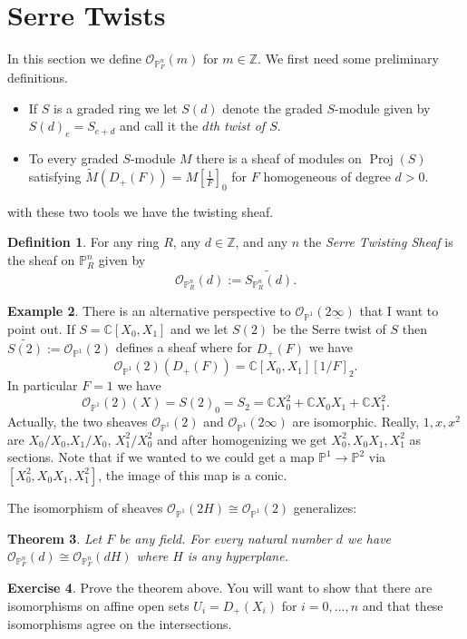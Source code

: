 \documentclass[12pt]{article}
\numberwithin{equation}{section}
\newtheorem{theorem}{Theorem}[subsection]
\theoremstyle{definition}
\newtheorem{definition}[theorem]{Definition}
\newtheorem{example}[theorem]{Example}
\newtheorem{exercise}[theorem]{Exercise}
\theoremstyle{remark}
\newcommand{\CC}{\mathbb{C}}
\newcommand{\ZZ}{\mathbb{Z}}
\newcommand{\Ocal}{\mathcal{O}}
\newcommand{\PP}{\mathbb{P}}
\newcommand{\Proj}{\operatorname{Proj}}
\begin{document}
\section{Serre Twists}
In this section we define $\Ocal_{\PP^n_F}(m)$ for $m \in \ZZ$. We first need some preliminary definitions.
\begin{itemize}
\item If $S$ is a graded ring we let $S(d)$ denote the graded $S$-module given by $S(d)_e = S_{e+d}$ and call it the \emph{$d$th twist of $S$}. 
\item To every graded $S$-module $M$ there is a sheaf of modules on $\Proj(S)$ satisfying $\widetilde{M}(D_+(F)) = M[\frac{1}{F}]_0$ for $F$ homogeneous of degree $d> 0$.
\end{itemize}
with these two tools we have the twisting sheaf.
\begin{definition}
	For any ring $R$, any $d\in \ZZ$, and any $n$ the \emph{Serre Twisting Sheaf} is the sheaf on $\PP^n_R$ given by 
	 $$\Ocal_{\PP^n_R}(d) := \widetilde{ S_{\PP^n_R}(d) }.$$
\end{definition} 


\begin{example}
	There is an alternative perspective to $\Ocal_{\PP^1}(2\underline{\infty})$ that I want to point out. 
	If $S = \CC[X_0,X_1]$ and we let $S(2)$ be the Serre twist of $S$ then $\widetilde{S(2)}:=\Ocal_{\PP^1}(2)$ defines a sheaf where for $D_+(F)$ we have 
	$$ \Ocal_{\PP^1}(2)(D_+(F)) = \CC[X_0,X_1][1/F]_2. $$
	In particular $F=1$ we have 
	$$ \Ocal_{\PP^1}(2)(X) = S(2)_0= S_2 = \CC X_0^2 + \CC X_0 X_1 + \CC X_1^2. $$
	Actually, the two sheaves $\Ocal_{\PP^1}(2)$ and $\Ocal_{\PP^1}(2\infty)$ are isomorphic. 
	Really, $1,x,x^2$ are $X_0/X_0$,$X_1/X_0$, $X_1^2/X_0^2$ and after homogenizing we get $X_0^2,X_0X_1,X_1^2$ as sections. 
	Note that if we wanted to we could get a map $\PP^1 \to \PP^2$ via $[X_0^2,X_0X_1,X_1^2]$, the image of this map is a conic.
\end{example}
The isomorphism of sheaves $\Ocal_{\PP^1}(2H) \cong \Ocal_{\PP^1}(2)$ generalizes:
\begin{theorem}
	Let $F$ be any field.
	For every natural number $d$ we have $\Ocal_{\PP^n_F}(d) \cong \Ocal_{\PP^n_F}(dH)$ where $H$ is any hyperplane.
\end{theorem}

\begin{exercise}
	Prove the theorem above. 
	You will want to show that there are isomorphisms on affine open sets $U_i=D_+(X_i)$ for $i=0,\ldots, n$ and that these isomorphisms agree on the intersections.
\end{exercise}
\end{document}
